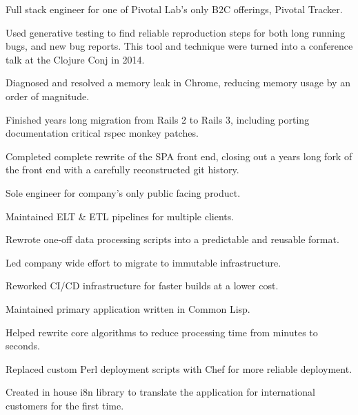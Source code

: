 \documentclass[]{deedy-resume-openfont}
\begin{document}
\vspace{\topsep}
Full stack engineer for one of Pivotal Lab's only B2C offerings, Pivotal Tracker.
\vspace{\topsep}
\begin{tightemize}
\item Used generative testing to find reliable reproduction steps for both long running bugs, and new bug reports. This tool and technique were turned into a conference talk at the Clojure Conj in 2014.
\item Diagnosed and resolved a memory leak in Chrome, reducing memory usage by an order of magnitude.
\item Finished years long migration from Rails 2 to Rails 3, including porting documentation critical rspec monkey patches.
\item Completed complete rewrite of the SPA front end, closing out a years long fork of the front end with a carefully reconstructed git history.
\end{tightemize}

\sectionsep
{}
\vspace{\topsep}
\begin{tightemize}
\item Sole engineer for company's only public facing product.
\item Maintained ELT \& ETL pipelines for multiple clients.
\item Rewrote one-off data processing scripts into a predictable and reusable format.
\item Led company wide effort to migrate to immutable infrastructure.
\item Reworked CI/CD infrastructure for faster builds at a lower cost.
\end{tightemize}

\sectionsep
{}
\vspace{\topsep}
\begin{tightemize}
\item Maintained primary application written in Common Lisp.
\item Helped rewrite core algorithms to reduce processing time from minutes to seconds.
\item Replaced custom Perl deployment scripts with Chef for more reliable deployment.
\item Created in house i8n library to translate the application for international customers for the first time.
\end{tightemize}
\end{document}
